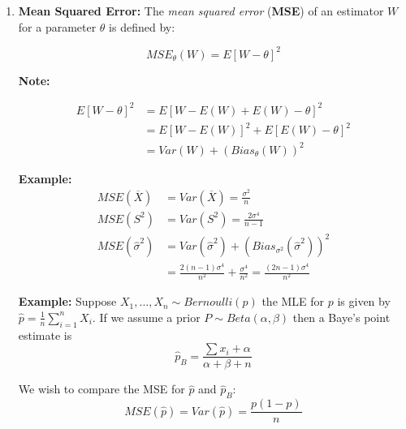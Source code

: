 \documentclass{article}
\begin{document}
\begin{enumerate}
    \item \textbf{Mean Squared Error:} The \textit{mean squared error} (\textbf{MSE}) of an estimator $W$ for a parameter $\theta$ is defined by:

    \begin{equation*}
        MSE_\theta(W) = E\left[W - \theta \right]^2
    \end{equation*}

    \textbf{Note:}

    \begin{equation*}
        \begin{split}
            E[W-\theta]^2 &= E[W - E(W) + E(W) - \theta]^2\\
                &= E[W-E(W)]^2 + E[E(W)-\theta]^2\\
                &= Var(W) + \left(Bias_\theta(W)\right)^2
        \end{split}
    \end{equation*}

    \textbf{Example:}
    \begin{equation*}
        \begin{split}
            MSE(\overline{X}) &= Var(\overline{X}) = \frac{\sigma^2}{n}\\
            MSE(S^2) &= Var(S^2) = \frac{2\sigma^4}{n-1}\\
            MSE(\hat{\sigma}^2) &= Var(\hat{\sigma}^2) + \left(Bias_{\sigma^2}(\hat{\sigma}^2)\right)^2\\
            &= \frac{2(n-1)\sigma^4}{n^2} + \frac{\sigma^4}{n^2} = \frac{(2n-1)\sigma^4}{n^2}
        \end{split}
    \end{equation*}

    \textbf{Example:} Suppose $X_1,...,X_n\sim Bernoulli(p)$ the MLE for $p$ is given by $\hat{p} = \frac{1}{n}\sum_{i=1}^n X_i$. If we assume a prior $P \sim Beta(\alpha,\beta)$ then a Baye's point estimate is
    \begin{equation*}
        \hat{p}_B = \frac{\sum x_i + \alpha}{\alpha + \beta + n}
    \end{equation*}

    We wish to compare the MSE for $\hat{p}$ and $\hat{p}_B$:
    \begin{equation*}
        MSE(\hat{p}) = Var(\hat{p}) = \frac{p(1-p)}{n}
    \end{equation*}


\end{enumerate}
\end{document}
